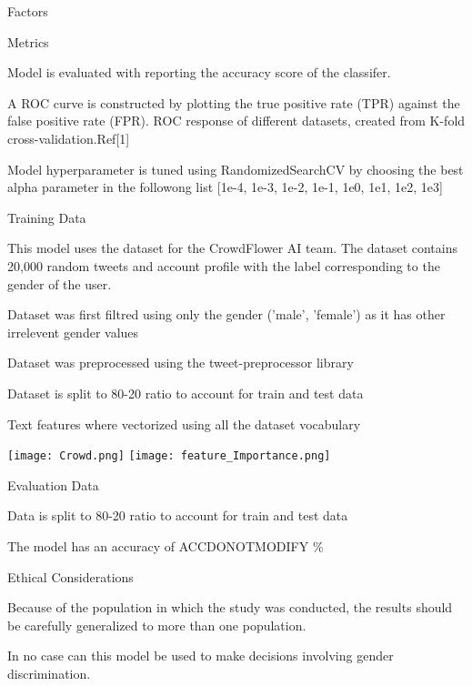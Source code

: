 \documentclass{article}
\begin{document}
\begin{adjustwidth}{-60pt}{-30pt}
\begin{singlespace}
\begin{tcolorbox}[title=\textbf{Model Card - Tweeter Gender Classification },
     breakable, sharp corners, boxrule=0.7pt]
{\begin{mcsection}{Factors}
 \end{mcsection}
 
 \begin{mcsection}{Metrics}
     \item Model is evaluated with reporting the accuracy score of the classifer.
     
     \item A ROC curve is constructed by plotting the true positive rate (TPR) against the false positive rate (FPR). ROC response of different datasets, created from K-fold cross-validation.Ref[1]
     \item Model hyperparameter is tuned using RandomizedSearchCV by choosing the best alpha parameter in the followong list [1e-4, 1e-3, 1e-2, 1e-1, 1e0, 1e1, 1e2, 1e3]
     
 \end{mcsection}
 
 \begin{mcsection}{Training Data}
     \item This model uses the dataset for the CrowdFlower AI team.  The dataset contains 20,000 random tweets and account profile with the label corresponding to the gender of the user.
     \item Dataset was first filtred using only the gender ('male', 'female') as it has other irrelevent gender values
     \item Dataset was preprocessed using the tweet-preprocessor library 
     \item Dataset is split to 80-20 ratio to account for train and test data
     \item Text features where vectorized using all the dataset vocabulary 

 \end{mcsection}
     \texttt{[image: Crowd.png]}
    \texttt{[image: feature\_Importance.png]}
 
 \begin{mcsection}{Evaluation Data}
   
     \item Data is split to 80-20 ratio to account for train and test data
     \item The model has an accuracy of ACCDONOTMODIFY \%
  

 \end{mcsection}
 
 
 \begin{mcsection}{Ethical Considerations}
     \item Because of the population in which the study was conducted, the results should be carefully generalized to more than one population.
     \item In no case can this model be used to make decisions involving gender discrimination.
 \end{mcsection}
 
}
\end{tcolorbox}
\end{singlespace}
\end{adjustwidth}
\end{document}
